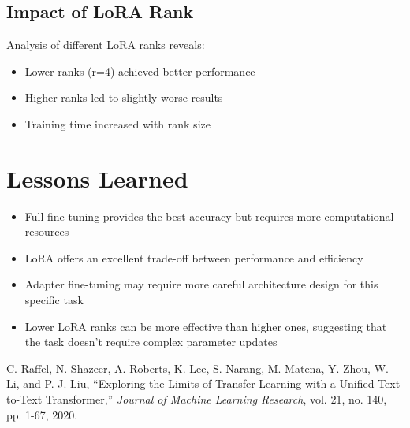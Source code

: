 \documentclass[conference]{IEEEtran}
\begin{document}
\subsection{Impact of LoRA Rank}
Analysis of different LoRA ranks reveals:
\begin{itemize}
    \item Lower ranks (r=4) achieved better performance
    \item Higher ranks led to slightly worse results
    \item Training time increased with rank size
\end{itemize}

\section{Lessons Learned}
\begin{itemize}
    \item Full fine-tuning provides the best accuracy but requires more computational resources
    \item LoRA offers an excellent trade-off between performance and efficiency
    \item Adapter fine-tuning may require more careful architecture design for this specific task
    \item Lower LoRA ranks can be more effective than higher ones, suggesting that the task doesn't require complex parameter updates
\end{itemize}

\begin{thebibliography}{9}
C. Raffel, N. Shazeer, A. Roberts, K. Lee, S. Narang, M. Matena, Y. Zhou, W. Li, and P. J. Liu,
``Exploring the Limits of Transfer Learning with a Unified Text-to-Text Transformer,''
\textit{Journal of Machine Learning Research}, vol. 21, no. 140, pp. 1-67, 2020.
\end{thebibliography}
\end{document}
